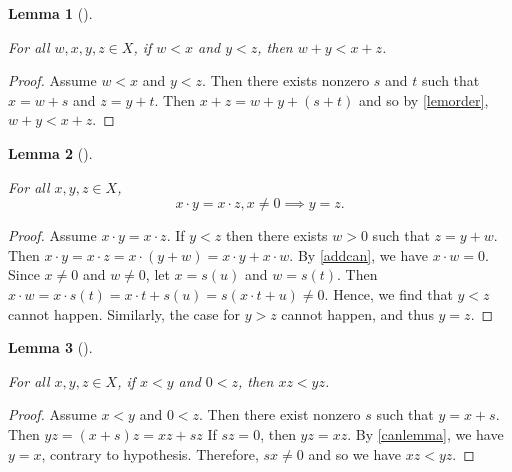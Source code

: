 \documentclass[
  letterpaper,
  10pt,
  reqno,
  twopage,
  openany]{book}
\theoremstyle{plain}
\newtheorem{lemma}{Lemma}[chapter]
\theoremstyle{definition}
\theoremstyle{definition}
\theoremstyle{definition}
\theoremstyle{plain}
\theoremstyle{plain}
\theoremstyle{remark}
\begin{document}
\leavevmode{}%
\begin{lemma}[]\label{lem-}

For all \(w,x,y,z\in X\), if \(w<x\) and \(y<z\), then \(w+y<x+z\).

\end{lemma}

\begin{proof}

Assume \(w<x\) and \(y<z\). Then there exists nonzero \(s\) and \(t\)
such that \(x=w+s\) and \(z=y+t\). Then \(x+z=w+y+(s+t)\) and so by
\ref{lemorder}, \(w+y<x+z\).

\end{proof}

\leavevmode{}%
\begin{lemma}[]\label{lem-}

\label{canlemma} For all \(x,y,z\in X\), \begin{equation}
\label{canmult}
x\cdot y=x\cdot z, x\neq 0 \implies y=z. 
\end{equation}

\end{lemma}

\begin{proof}

Assume \(x\cdot y = x\cdot z.\) If \(y<z\) then there exists \(w>0\)
such that \(z=y+w\). Then
\(x\cdot y=x\cdot z=x\cdot (y+w)=x\cdot y+x\cdot w\). By \ref{addcan},
we have \(x\cdot w=0\). Since \(x\neq0\) and \(w\neq 0\), let \(x=s(u)\)
and \(w=s(t)\). Then
\(x\cdot w=x\cdot s(t)=x\cdot t+s(u)=s(x\cdot t+u)\neq 0\). Hence, we
find that \(y<z\) cannot happen. Similarly, the case for \(y>z\) cannot
happen, and thus \(y=z\).

\end{proof}

\leavevmode{}%
\begin{lemma}[]\label{lem-}

For all \(x,y,z\in X\), if \(x<y\) and \(0<z\), then \(xz<yz\).

\end{lemma}

\begin{proof}

Assume \(x<y\) and \(0<z.\) Then there exist nonzero \(s\) such that
\(y=x+s\). Then \(yz=(x+s)z=xz+sz\) If \(sz=0\), then \(yz=xz\). By
\ref{canlemma}, we have \(y=x\), contrary to hypothesis. Therefore,
\(sx\neq 0\) and so we have \(xz<yz\).

\end{proof}
\end{document}
